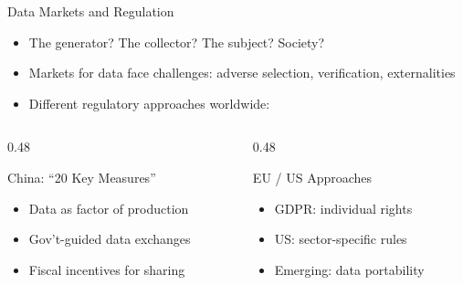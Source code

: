 \documentclass{beamer}
\begin{document}
\begin{frame}{Data Markets and Regulation}

    \begin{itemize}
        \item {} The generator? The collector? The subject? Society?
        \item Markets for data face challenges: adverse selection, verification, externalities
        \item Different regulatory approaches worldwide:
    \end{itemize}

    \vspace{0.2em}
    {\small
    \begin{columns}[T]
        \begin{column}{0.48\textwidth}
            \begin{block}{China: ``20 Key Measures''}
                \begin{itemize}
                    \item Data as factor of production
                    \item Gov't-guided data exchanges
                    \item Fiscal incentives for sharing
                \end{itemize}
            \end{block}
        \end{column}
        \begin{column}{0.48\textwidth}
            \begin{block}{EU / US Approaches}
                \begin{itemize}
                    \item GDPR: individual rights
                    \item US: sector-specific rules
                    \item Emerging: data portability
                \end{itemize}
            \end{block}
        \end{column}
    \end{columns}
    }

    \vspace{0.2em}

\end{frame}
\end{document}
